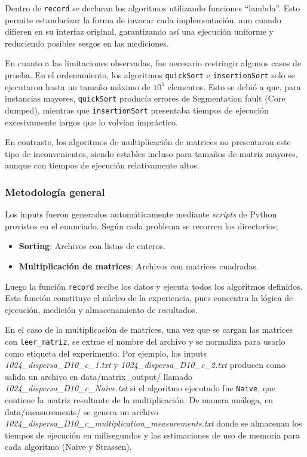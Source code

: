 Dentro de \texttt{record} se declaran los algoritmos utilizando funciones ``lambda''. 
Esto permite estandarizar la forma de invocar cada implementación, aun cuando difieren en su 
interfaz original, garantizando así una ejecución uniforme y reduciendo posibles sesgos 
en las mediciones. 

En cuanto a las limitaciones observadas, fue necesario restringir algunos casos de prueba. 
En el ordenamiento, los algoritmos \texttt{quickSort} e \texttt{insertionSort} 
solo se ejecutaron hasta un tamaño máximo de $10^5$ elementos. 
Esto se debió a que, para instancias mayores, \texttt{quickSort} producía 
errores de \textsf{Segmentation fault (Core dumped)}, mientras que 
\texttt{insertionSort} presentaba tiempos de ejecución excesivamente largos 
que lo volvían impráctico. 

En contraste, los algoritmos de multiplicación de matrices no presentaron este tipo de inconvenientes, 
siendo estables incluso para tamaños de matriz mayores, aunque con tiempos de ejecución
relativamente altos.

\vspace{0.5em}

\subsubsection{Metodología general}

Los inputs fueron generados automáticamente mediante \textit{scripts} de Python provistos en el enunciado.
Según cada problema se recorren los directorios;

\begin{itemize}
    \item \textbf{Sorting}: Archivos con listas de enteros.
    \item \textbf{Multiplicación de matrices}: Archivos con matrices cuadradas.
\end{itemize}

Luego la función \texttt{record} recibe los datos y ejecuta todos los algoritmos definidos.
Esta función constituye el núcleo de la experiencia, pues concentra la lógica de ejecución, 
medición y almacenamiento de resultados. 

En el caso de la multiplicación de matrices, una vez que se cargan las matrices con 
\texttt{leer\_matriz}, se extrae el nombre del archivo y se normaliza para usarlo como 
etiqueta del experimento. Por ejemplo, los inputs 
\textit{1024\_dispersa\_D10\_c\_1.txt} y \textit{1024\_dispersa\_D10\_c\_2.txt} 
producen como salida un archivo en \textsf{data/matrix\_output/} llamado 
\textit{1024\_dispersa\_D10\_c\_Naive.txt} si el algoritmo ejecutado fue 
\texttt{Naive}, que contiene la matriz resultante de la multiplicación. 
De manera análoga, en \textsf{data/measurements/} se genera un archivo 
\textit{1024\_dispersa\_D10\_c\_multiplication\_measurements.txt} donde se 
almacenan los tiempos de ejecución en milisegundos y las estimaciones de uso de memoria 
para cada algoritmo (Naive y Strassen). 

